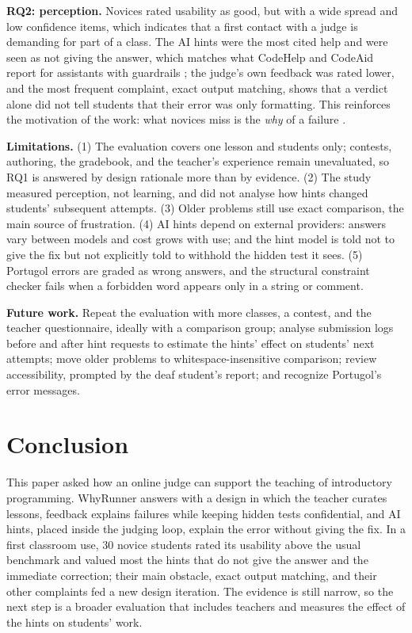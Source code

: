 \documentclass[12pt]{article}
\begin{document}
\textbf{RQ2: perception.} Novices rated usability as good, but with a wide spread and low confidence items, which indicates that a first contact with a judge is demanding for part of a class. The AI hints were the most cited help and were seen as not giving the answer, which matches what CodeHelp and CodeAid report for assistants with guardrails \cite{liffiton2023codehelp,kazemitabaar2024codeaid}; the judge's own feedback was rated lower, and the most frequent complaint, exact output matching, shows that a verdict alone did not tell students that their error was only formatting. This reinforces the motivation of the work: what novices miss is the \emph{why} of a failure \cite{keuning2018systematic}.

\textbf{Limitations.} (1) The evaluation covers one lesson and students only; contests, authoring, the gradebook, and the teacher's experience remain unevaluated, so RQ1 is answered by design rationale more than by evidence. (2) The study measured perception, not learning, and did not analyse how hints changed students' subsequent attempts. (3) Older problems still use exact comparison, the main source of frustration. (4) AI hints depend on external providers: answers vary between models and cost grows with use; and the hint model is told not to give the fix but not explicitly told to withhold the hidden test it sees. (5) Portugol errors are graded as wrong answers, and the structural constraint checker fails when a forbidden word appears only in a string or comment.

\textbf{Future work.} Repeat the evaluation with more classes, a contest, and the teacher questionnaire, ideally with a comparison group; analyse submission logs before and after hint requests to estimate the hints' effect on students' next attempts; move older problems to whitespace-insensitive comparison; review accessibility, prompted by the deaf student's report; and recognize Portugol's error messages.

\section{Conclusion}

This paper asked how an online judge can support the teaching of introductory programming. WhyRunner answers with a design in which the teacher curates lessons, feedback explains failures while keeping hidden tests confidential, and AI hints, placed inside the judging loop, explain the error without giving the fix. In a first classroom use, 30 novice students rated its usability above the usual benchmark and valued most the hints that do not give the answer and the immediate correction; their main obstacle, exact output matching, and their other complaints fed a new design iteration. The evidence is still narrow, so the next step is a broader evaluation that includes teachers and measures the effect of the hints on students' work.



\end{document}

